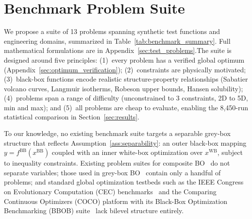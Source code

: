 \documentclass[12pt,a4paper]{article}%
\theoremstyle{plain}%
\theoremstyle{remark}%
\theoremstyle{definition}%
\def\WB{\mathrm{WB}}
\def\BB{\mathrm{BB}}
\begin{document}
\section{Benchmark Problem Suite}\label{sec:benchmark_suite}

We propose a suite of 13 problems spanning synthetic test functions and engineering domains, summarized in Table~\ref{tab:benchmark_summary}. Full mathematical formulations are in Appendix~\ref{sec:test_problems}.The suite is designed around five principles: (1)~every problem has a verified global optimum (Appendix~\ref{sec:optimum_verification}); (2)~constraints are physically motivated; (3)~black-box functions encode realistic structure-property relationships (Sabatier volcano curves, Langmuir isotherms, Robeson upper bounds, Hansen solubility); (4)~problems span a range of difficulty (unconstrained to 3 constraints, 2D to 5D, min and max); and (5)~all problems are cheap to evaluate, enabling the 8{,}450-run statistical comparison in Section~\ref{sec:results}.

To our knowledge, no existing benchmark suite targets a separable grey-box structure that reflects Assumption~\ref{ass:separability}: an outer black-box mapping $y = f^{\BB}(x^{\BB})$ coupled with an inner white-box optimization over $x^{\WB}$, subject to inequality constraints. Existing problem suites for composite BO~\cite{astudillo2019bocf} do not separate variables; those used in grey-box BO~\cite{paulson2022cobalt} contain only a handful of problems; and standard global optimization testbeds such as the IEEE Congress on Evolutionary Computation (CEC) benchmarks~\cite{suganthan2005cec} and the Comparing Continuous Optimizers (COCO) platform with its Black-Box Optimization Benchmarking (BBOB) suite~\cite{hansen2021coco} lack bilevel structure entirely. 
\end{document}
